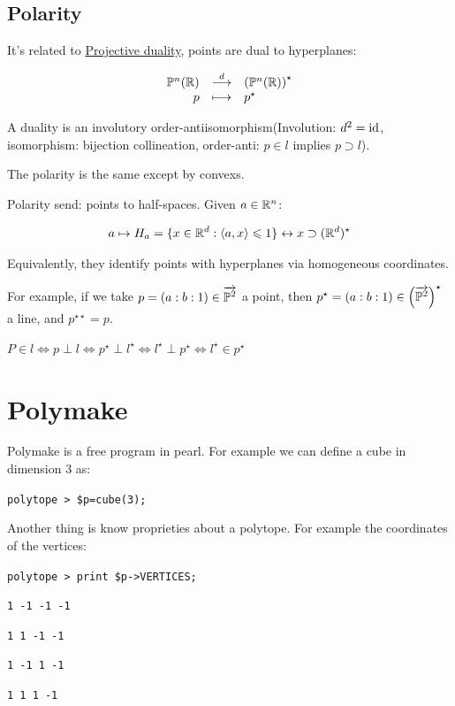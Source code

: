 \subsection{Polarity}

It's related to \underline{Projective duality}, points are dual to hyperplanes:

$$\begin{array}{rcl}
    \mathbb{P}^n(\mathbb{R})	&\stackrel{d}{\longrightarrow}	&\left(\mathbb{P}^n(\mathbb{R})\right)^{\star}\\
    p			&\longmapsto				&p^{\star}
  \end{array}$$

A duality is an involutory order-antiisomorphism(Involution: $d^2=\operatorname{id}$, isomorphism: bijection collineation, order-anti: $p\in l$ implies $p\supset l$).

The polarity is the same except by convexs.

Polarity send: points to half-spaces. Given $a\in \mathbb{R}^n$:

$$a\mapsto H_a=\{x\in\mathbb{R}^d:\langle a,x\rangle\leqslant 1\}\leftrightarrow x\supset (\mathbb{R}^d)^{\star}$$

Equivalently, they identify points with hyperplanes via homogeneous coordinates.

For example, if we take $p=(a:b:1)\in \overrightarrow{\mathbb{P}^2}$ a point, then $p^{\star}=(a:b:1)\in \left(\overrightarrow{\mathbb{P}^2}\right)^{\star}$ a line, and $p^{\star\star}=p$.

$P\in l\Leftrightarrow p\perp l\Leftrightarrow p^{\star}\perp l^{\star}\Leftrightarrow l^{\star}\perp p^{\star}\Leftrightarrow l^{\star}\in p^{\star}$ 

\section{Polymake}

Polymake is a free program in pearl. For example we can define a cube in dimension 3 as:

\texttt{polytope > \$p=cube(3);}

Another thing is know proprieties about a polytope. For example the coordinates of the vertices:

\texttt{polytope > print \$p->VERTICES;}

\texttt{1 -1 -1 -1}

\texttt{1 1 -1 -1}

\texttt{1 -1 1 -1}

\texttt{1 1 1 -1}


